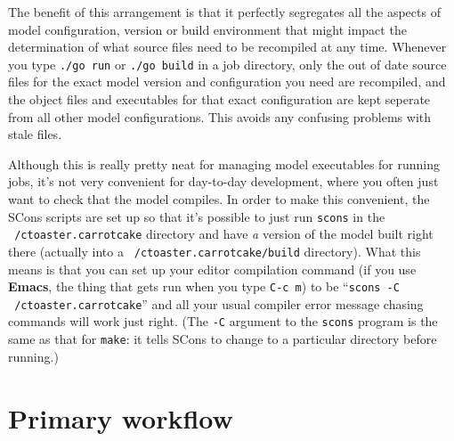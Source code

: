 \documentclass[a4paper,10pt,article]{memoir}
\begin{document}
The benefit of this arrangement is that it perfectly segregates all
the aspects of model configuration, version or build environment that
might impact the determination of what source files need to be
recompiled at any time.  Whenever you type \texttt{./go run} or
\texttt{./go build} in a job directory, only the out of date source
files for the exact model version and configuration you need are
recompiled, and the object files and executables for that exact
configuration are kept seperate from all other model configurations.
This avoids any confusing problems with stale files.

Although this is really pretty neat for managing model executables for
running jobs, it's not very convenient for day-to-day development,
where you often just want to check that the model compiles.  In order
to make this convenient, the SCons scripts are set up so that it's
possible to just run \texttt{scons} in the \texttt{~/ctoaster.carrotcake} directory
and have \emph{a} version of the model built right there (actually
into a \texttt{~/ctoaster.carrotcake/build} directory).  What this means is that
you can set up your editor compilation command (if you use \textbf{Emacs}, the
thing that gets run when you type \texttt{C-c m}) to be
``\texttt{scons -C ~/ctoaster.carrotcake}'' and all your usual compiler error
message chasing commands will work just right.  (The \texttt{-C}
argument to the \texttt{scons} program is the same as that for
\texttt{make}: it tells SCons to change to a particular directory
before running.) 

\section{Primary workflow}
\end{document}
